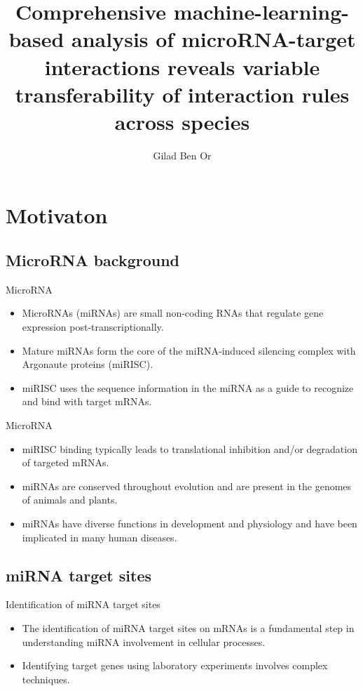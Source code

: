 \documentclass{beamer}
\title[This is my Title]{Comprehensive machine-learning-based analysis of microRNA-target interactions reveals variable transferability of interaction rules across species}
\author[A. Author]{Gilad Ben Or}
\begin{document}
	\typesetFrontSlides


\section{Motivaton}

\subsection[Background]{MicroRNA background}
\begin{frame}{MicroRNA}
	\begin{itemize}
\item MicroRNAs (miRNAs) are small non-coding RNAs that regulate gene expression post-transcriptionally. 
\item Mature miRNAs form the core of the miRNA-induced silencing complex with Argonaute proteins (miRISC).
\item miRISC uses the sequence information in the miRNA as a guide to recognize and bind with target mRNAs.

\end{itemize}
\end{frame}

\begin{frame}{MicroRNA}
	\begin{itemize}
\item miRISC binding typically leads to translational inhibition and/or degradation of targeted mRNAs.
\item miRNAs are conserved throughout evolution and are present in the genomes of animals and plants.  
\item miRNAs have diverse functions in development and physiology and have been implicated in many human diseases.
\end{itemize}
\end{frame}

\subsection{miRNA target sites}
\begin{frame}{Identification of miRNA target sites}
	\begin{itemize}
	\item The identification of miRNA target sites on mRNAs is a fundamental step in understanding miRNA involvement in cellular processes.

	\item Identifying target genes using laboratory experiments involves complex techniques.
\end{itemize}
\end{frame}
\end{document}
